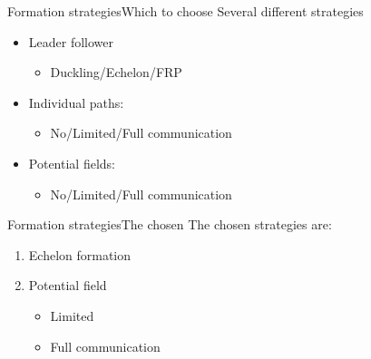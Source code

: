 \documentclass[10pt,handout]{beamer}
\begin{document}

\begin{frame}{Formation strategies}{Which to choose}
Several different strategies
  \begin{itemize}
    \item Leader follower
    \begin{itemize}
      \item Duckling/Echelon/FRP
    \end{itemize}
    \item Individual paths:
      \begin{itemize}
        \item No/Limited/Full communication
      \end{itemize}
    \item Potential fields:
      \begin{itemize}
        \item No/Limited/Full communication
      \end{itemize}
  \end{itemize}
\end{frame}

\begin{frame}{Formation strategies}{The chosen}
The chosen strategies are:
\begin{enumerate}
  \item Echelon formation
  \item Potential field
  \begin{itemize}
    \item Limited
  \end{itemize}
  \begin{itemize}
    \item Full communication
  \end{itemize}
\end{enumerate}
\end{frame}
\end{document}
